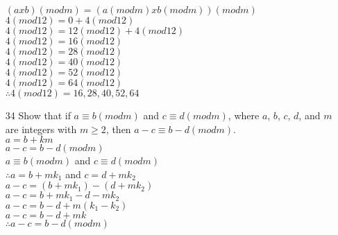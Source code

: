 \documentclass[a4paper]{article}
\newcommand\tab[1][0.5cm]{\hspace*{#1}}
\begin{document}
\begin{itemize}
    \tab $(a x b)(mod m) = (a (mod m) x b (mod m))(mod m)$ \\
    \tab $4 (mod 12) = 0 + 4 (mod 12)$ \\
    \tab $4 (mod 12) = 12 (mod 12) + 4 (mod 12)$ \\
    \tab $4 (mod 12) = 16 (mod 12)$ \\
    \tab $4 (mod 12) = 28 (mod 12)$ \\
    \tab $4 (mod 12) = 40 (mod 12)$ \\
    \tab $4 (mod 12) = 52 (mod 12)$ \\
    \tab $4 (mod 12) = 64 (mod 12)$ \\
    \tab $\therefore 4 (mod 12) = 16, 28, 40, 52, 64$
    \item[34] Show that if $a \equiv b (mod m)$ and $c \equiv d (mod m)$, where $a$, $b$, $c$, $d$, and $m$ are integers with $m \geq 2$, then $a - c \equiv b - d (mod m)$. \\
    \tab $a = b + km$ \\
    \tab $a - c = b - d (mod m)$ \\
    \tab $a \equiv b (mod m)$ and $c \equiv d (mod m)$ \\
    \tab $\therefore a = b + mk_{1}$ and $c = d + mk_{2}$ \\
    \tab $a - c = (b + mk_{1}) - (d + mk_{2})$ \\
    \tab $a - c = b + mk_{1} - d - mk_{2}$ \\
    \tab $a - c = b - d + m(k_{1} - k_{2})$ \\
    \tab $a - c = b - d + mk$ \\
    \tab $\therefore a - c = b - d (mod m)$
  \end{itemize}
\end{document}
